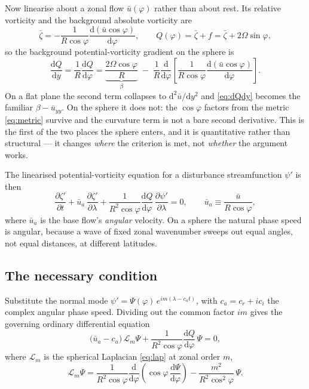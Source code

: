 \documentclass[11pt,a4paper]{article}
\newcommand{\dd}{\mathrm{d}}
\begin{document}
Now linearise about a zonal flow $\bar u(\varphi)$ rather than about rest. Its
relative vorticity and the background absolute vorticity are
%
\begin{equation}
\bar\zeta = -\frac{1}{R\cos\varphi}
   \frac{\dd(\bar u\cos\varphi)}{\dd\varphi} ,
\qquad
Q(\varphi) = \bar\zeta + f = \bar\zeta + 2\Omega\sin\varphi ,
\label{eq:basestate}
\end{equation}
%
so the background potential-vorticity gradient on the sphere is
%
\begin{equation}
\frac{\dd Q}{\dd y} = \frac{1}{R}\frac{\dd Q}{\dd\varphi}
= \underbrace{\frac{2\Omega\cos\varphi}{R}}_{\textstyle \beta}
 \;-\; \frac{1}{R}\frac{\dd}{\dd\varphi}\!
   \left[\frac{1}{R\cos\varphi}
   \frac{\dd(\bar u\cos\varphi)}{\dd\varphi}\right] .
\label{eq:dQdy}
\end{equation}
%
On a flat plane the second term collapses to $\dd^2\bar u/\dd y^2$ and
\eqref{eq:dQdy} becomes the familiar $\beta - \bar u_{yy}$. On the sphere it does
not: the $\cos\varphi$ factors from the metric \eqref{eq:metric} survive and the
curvature term is not a bare second derivative. This is the first of the two
places the sphere enters, and it is quantitative rather than structural --- it
changes \emph{where} the criterion is met, not \emph{whether} the argument works.

The linearised potential-vorticity equation for a disturbance streamfunction
$\psi'$ is then
%
\begin{equation}
\frac{\partial\zeta'}{\partial t}
 + \bar u_a\,\frac{\partial\zeta'}{\partial\lambda}
 + \frac{1}{R^2\cos\varphi}\frac{\dd Q}{\dd\varphi}\,
   \frac{\partial\psi'}{\partial\lambda} = 0 ,
\qquad
\bar u_a \equiv \frac{\bar u}{R\cos\varphi} ,
\label{eq:linpv}
\end{equation}
%
where $\bar u_a$ is the base flow's \emph{angular} velocity. On a sphere the
natural phase speed is angular, because a wave of fixed zonal wavenumber sweeps
out equal angles, not equal distances, at different latitudes.

\subsection{The necessary condition}

Substitute the normal mode
$\psi' = \Psi(\varphi)\,e^{i m(\lambda - c_a t)}$, with $c_a = c_r + i c_i$ the
complex angular phase speed. Dividing out the common factor $i m$ gives the
governing ordinary differential equation
%
\begin{equation}
\big(\bar u_a - c_a\big)\,\mathcal{L}_m\Psi
 + \frac{1}{R^2\cos\varphi}\frac{\dd Q}{\dd\varphi}\,\Psi = 0 ,
\label{eq:evp}
\end{equation}
%
where $\mathcal{L}_m$ is the spherical Laplacian \eqref{eq:lap} at zonal order
$m$,
%
\begin{equation}
\mathcal{L}_m\Psi = \frac{1}{R^2\cos\varphi}
   \frac{\dd}{\dd\varphi}\!\left(\cos\varphi\,\frac{\dd\Psi}{\dd\varphi}\right)
 - \frac{m^2}{R^2\cos^2\!\varphi}\,\Psi .
\label{eq:Lm}
\end{equation}
\end{document}
